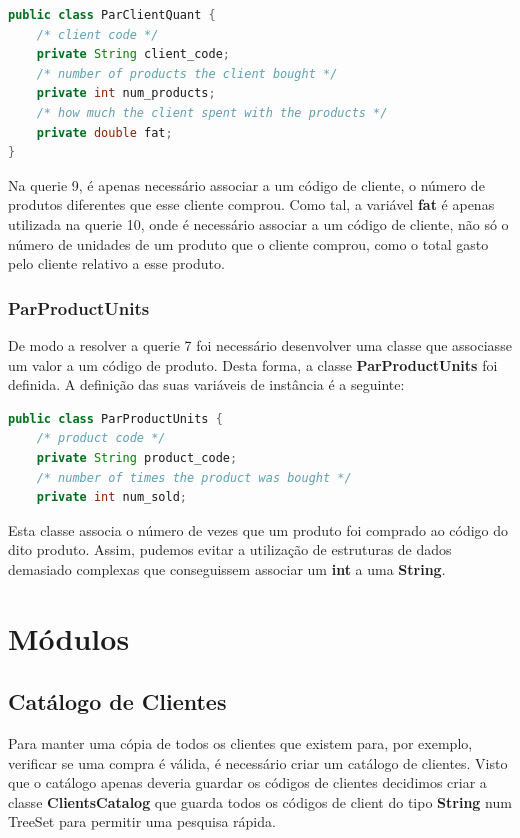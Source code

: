 \documentclass[10pt] {article}
\begin{document}
\begin{lstlisting}[language=Java]
public class ParClientQuant {
    /* client code */
	private String client_code;
	/* number of products the client bought */
    private int num_products;
    /* how much the client spent with the products */
    private double fat;
}
\end{lstlisting}

\par Na querie 9, é apenas necessário associar a um código de cliente, o número de produtos diferentes que esse cliente
comprou. Como tal, a variável \textbf{fat} é apenas utilizada na querie 10, onde é necessário associar a um código de
cliente, não só o número de unidades de um produto que o cliente comprou, como o total gasto pelo cliente relativo a esse
produto.

\subsubsection{ParProductUnits}
\par De modo a resolver a querie 7 foi necessário desenvolver uma classe que associasse um valor a um código de produto.
Desta forma, a classe \textbf{ParProductUnits} foi definida. A definição das suas variáveis de instância é a seguinte:

\begin{lstlisting}[language=Java]
public class ParProductUnits {
	/* product code */
    private String product_code;
    /* number of times the product was bought */
    private int num_sold;
\end{lstlisting}

\par Esta classe associa o número de vezes que um produto foi comprado ao código do dito produto. Assim, pudemos evitar
a utilização de estruturas de dados demasiado complexas que conseguissem associar um \textbf{int} a uma \textbf{String}.

\newpage
\section{Módulos}
\subsection{Catálogo de Clientes}
\par Para manter uma cópia de todos os clientes que existem para, por exemplo, verificar se uma compra é válida, é necessário
criar um catálogo de clientes. Visto que o catálogo apenas deveria guardar os códigos de clientes decidimos criar a classe
\textbf{ClientsCatalog} que guarda todos os códigos de client do tipo \textbf{String} num TreeSet para permitir uma pesquisa
rápida.
\end{document}
